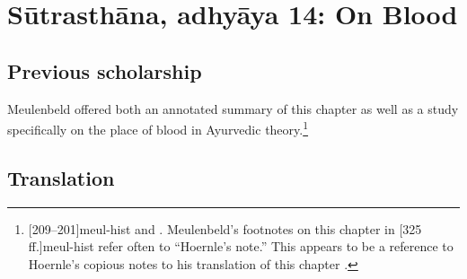 
\section{Sūtrasthāna, adhyāya 14:  On Blood}


\subsection{Previous scholarship}

Meulenbeld offered both an annotated summary of this chapter as well as a
 study specifically on the place of blood
in Ayurvedic theory.\footnote{[209--201]{meul-hist}  and  \cite{meul-1991}.  Meulenbeld's footnotes on this chapter in [325\,ff.]{meul-hist} refer often to ``Hoernle's note.''  This appears to be a reference to Hoernle's copious notes to his translation of this chapter \citep[87--98]{hoer-1897}.}







\subsection{Translation}

